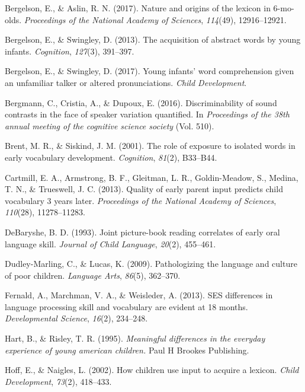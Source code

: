 \documentclass[floatsintext,man]{apa6}
\theoremstyle{definition}
\theoremstyle{definition}
\theoremstyle{definition}
\theoremstyle{remark}
\begin{document}
\hypertarget{refs}{}
\hypertarget{ref-bergelson2017nature}{}
Bergelson, E., \& Aslin, R. N. (2017). Nature and origins of the lexicon
in 6-mo-olds. \emph{Proceedings of the National Academy of Sciences},
\emph{114}(49), 12916--12921.

\hypertarget{ref-bergelson2013acquisition}{}
Bergelson, E., \& Swingley, D. (2013). The acquisition of abstract words
by young infants. \emph{Cognition}, \emph{127}(3), 391--397.

\hypertarget{ref-bergelson2017young}{}
Bergelson, E., \& Swingley, D. (2017). Young infants' word comprehension
given an unfamiliar talker or altered pronunciations. \emph{Child
Development}.

\hypertarget{ref-bergmann2016discriminability}{}
Bergmann, C., Cristia, A., \& Dupoux, E. (2016). Discriminability of
sound contrasts in the face of speaker variation quantified. In
\emph{Proceedings of the 38th annual meeting of the cognitive science
society} (Vol. 510).

\hypertarget{ref-brent2001role}{}
Brent, M. R., \& Siskind, J. M. (2001). The role of exposure to isolated
words in early vocabulary development. \emph{Cognition}, \emph{81}(2),
B33--B44.

\hypertarget{ref-cartmill2013quality}{}
Cartmill, E. A., Armstrong, B. F., Gleitman, L. R., Goldin-Meadow, S.,
Medina, T. N., \& Trueswell, J. C. (2013). Quality of early parent input
predicts child vocabulary 3 years later. \emph{Proceedings of the
National Academy of Sciences}, \emph{110}(28), 11278--11283.

\hypertarget{ref-debaryshe1993joint}{}
DeBaryshe, B. D. (1993). Joint picture-book reading correlates of early
oral language skill. \emph{Journal of Child Language}, \emph{20}(2),
455--461.

\hypertarget{ref-dudley2009pathologizing}{}
Dudley-Marling, C., \& Lucas, K. (2009). Pathologizing the language and
culture of poor children. \emph{Language Arts}, \emph{86}(5), 362--370.

\hypertarget{ref-fernald2013ses}{}
Fernald, A., Marchman, V. A., \& Weisleder, A. (2013). SES differences
in language processing skill and vocabulary are evident at 18 months.
\emph{Developmental Science}, \emph{16}(2), 234--248.

\hypertarget{ref-hart1995meaningful}{}
Hart, B., \& Risley, T. R. (1995). \emph{Meaningful differences in the
everyday experience of young american children.} Paul H Brookes
Publishing.

\hypertarget{ref-hoff2002children}{}
Hoff, E., \& Naigles, L. (2002). How children use input to acquire a
lexicon. \emph{Child Development}, \emph{73}(2), 418--433.
\end{document}
